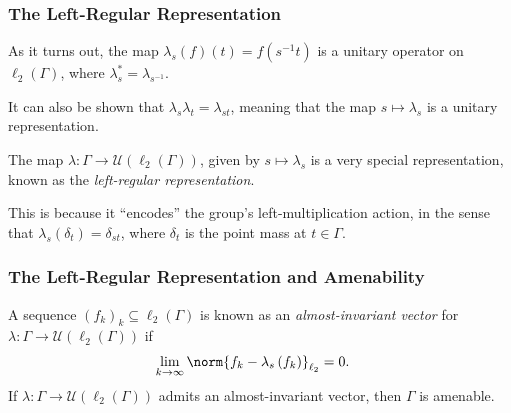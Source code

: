 \documentclass{beamer-custom}
\begin{document}
\begin{frame}
  \frametitle{The Left-Regular Representation}
  As it turns out, the map $\lambda_s(f)(t) = f\left( s^{-1}t \right)$ is a unitary operator on $\ell_2\left( \Gamma \right)$, where $\lambda_s^{\ast} = \lambda_{s^{-1}}$.\pause\newline

  It can also be shown that $\lambda_s\lambda_t = \lambda_{st}$, meaning that the map $s\mapsto \lambda_s$ is a unitary representation.\pause\newline

  The map $\lambda\colon \Gamma\rightarrow \mathcal{U}\left( \ell_2\left( \Gamma \right) \right)$, given by $s\mapsto \lambda_s$ is a very special representation, known as the \textit{left-regular representation}.\pause\newline

  This is because it ``encodes'' the group's left-multiplication action, in the sense that $\lambda_s\left(\delta_t\right) = \delta_{st}$, where $\delta_t$ is the point mass at $t\in\Gamma$.
\end{frame}
\begin{frame}
  \frametitle{The Left-Regular Representation and Amenability}
  A sequence $\left( f_k \right)_k\subseteq \ell_2\left( \Gamma \right)$ is known as an \textit{almost-invariant vector} for $\lambda\colon \Gamma\rightarrow \mathcal{U}\left( \ell_2\left( \Gamma \right) \right)$ if
  \begin{align*}
    \lim_{k\rightarrow\infty}\norm{f_k - \lambda_s\left( f_k \right)}_{\ell_2} &= 0.
  \end{align*}\pause
  If $\lambda\colon \Gamma\rightarrow \mathcal{U}\left( \ell_2\left( \Gamma \right) \right)$ admits an almost-invariant vector, then $\Gamma$ is amenable.
\end{frame}
\end{document}
